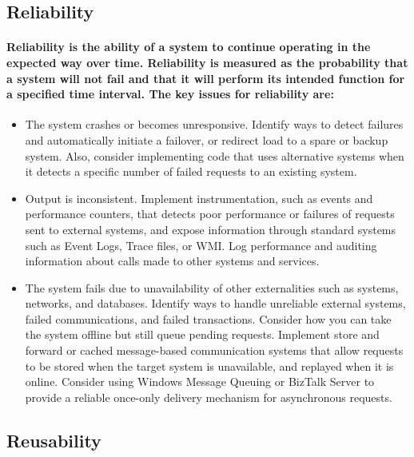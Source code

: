 \documentclass[../Psychological_system_web_application.tex]{subfiles}
\begin{document}
			\subsection{Reliability}
			
			
				\paragraph{\gls{Reliability} is the ability of a system to continue operating in the expected way over time. Reliability is measured as the probability that a system will not fail and that it will perform its intended function for a specified time interval. The key issues for reliability are:}
				
				
				\begin{itemize}
					\item
						The system crashes or becomes unresponsive. Identify ways to detect failures and automatically initiate a failover, or redirect load to a spare or backup system. Also, consider implementing code that uses alternative systems when it detects a specific number of failed requests to an existing system.
					\item
						Output is inconsistent. Implement instrumentation, such as events and performance counters, that detects poor performance or failures of requests sent to external systems, and expose information through standard systems such as Event Logs, Trace files, or WMI. Log performance and auditing information about calls made to other systems and services.
					\item
						The system fails due to unavailability of other externalities such as systems, networks, and databases. Identify ways to handle unreliable external systems, failed communications, and failed transactions. Consider how you can take the system offline but still queue pending requests. Implement store and forward or cached message-based communication systems that allow requests to be stored when the target system is unavailable, and replayed when it is online. Consider using Windows Message Queuing or BizTalk Server to provide a reliable once-only delivery mechanism for asynchronous requests.
					
				\end{itemize}
				
				
			\subsection{Reusability}
			
\end{document}
